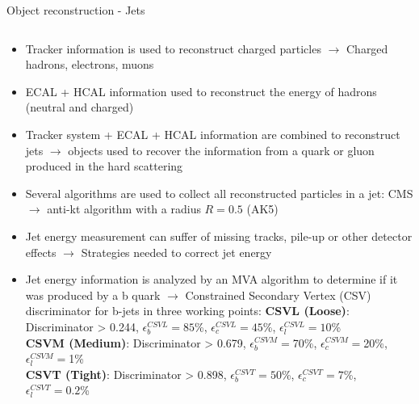 \begin{frame}{Object reconstruction - Jets}
\vspace{-.9cm}

\begin{columns}
\begin{column}{.55\textwidth}
\begin{block}{}
\begin{itemize}\tiny
\item Tracker information is used to reconstruct charged particles $\to$ Charged hadrons, electrons, muons
\item ECAL + HCAL information used to reconstruct the energy of hadrons (neutral and charged)
\item Tracker system + ECAL + HCAL information are combined to reconstruct jets $\to$ objects used to recover the information from a quark or gluon produced in the hard scattering
\item Several algorithms are used to collect all reconstructed particles in a jet: CMS $\to$ anti-kt algorithm with a radius $R=0.5$ (AK5)
\item Jet energy measurement can suffer of missing tracks, pile-up or other detector effects $\to$ Strategies needed to correct jet energy 
\item Jet energy information is analyzed by an MVA algorithm to determine if it was produced by a b quark $\to$ Constrained Secondary Vertex (CSV) discriminator for b-jets in three working points:
\tiny{
\textbf{CSVL (Loose)}: Discriminator > 0.244, $\epsilon^{CSVL}_{b}=85$\%, $\epsilon^{CSVL}_{c}=45$\%, $\epsilon^{CSVL}_{l}=10$\%\\
\textbf{CSVM (Medium)}: Discriminator > 0.679, $\epsilon^{CSVM}_{b}=$70\%, $\epsilon^{CSVM}_{c}=$20\%, $\epsilon^{CSVM}_{l}=$1\%\\
\textbf{CSVT (Tight)}: Discriminator > 0.898, $\epsilon^{CSVT}_{b}=50$\%, $\epsilon^{CSVT}_{c}=7$\%, $\epsilon^{CSVT}_{l}=0.2$\%\\
}%
\end{itemize}
\end{block}
\end{column}


\end{columns}
\end{frame}
